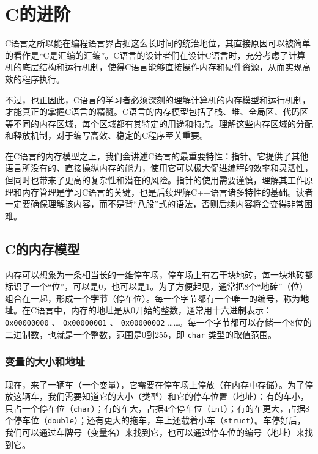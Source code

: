 \chapter{C的进阶}

C语言之所以能在编程语言界占据这么长时间的统治地位，其直接原因可以被简单的看作是“C是汇编的汇编”。C语言的设计者们在设计C语言时，充分考虑了计算机的底层结构和运行机制，使得C语言能够直接操作内存和硬件资源，从而实现高效的程序执行。

不过，也正因此，C语言的学习者必须深刻的理解计算机的内存模型和运行机制，才能真正的掌握C语言的精髓。C语言的内存模型包括了栈、堆、全局区、代码区等不同的内存区域，每个区域都有其特定的用途和特点。理解这些内存区域的分配和释放机制，对于编写高效、稳定的C程序至关重要。

在C语言的内存模型之上，我们会讲述C语言的最重要特性：指针。它提供了其他语言所没有的、直接操纵内存的能力，使用它可以极大促进编程的效率和灵活性，但同时也带来了更高的复杂性和潜在的风险。指针的使用需要谨慎，理解其工作原理和内存管理是学习C语言的关键，也是后续理解C++语言诸多特性的基础。读者一定要确保理解该内容，而不是背“八股”式的语法，否则后续内容将会变得非常困难。

\section{C的内存模型}

内存可以想象为一条相当长的一维停车场，停车场上有若干块地砖，每一块地砖都标识了一个“位”，可以是0，也可以是1。为了方便起见，通常把8个“地砖”（位）组合在一起，形成一个\textbf{字节}（停车位）。每一个字节都有一个唯一的编号，称为\textbf{地址}。在C语言中，内存的地址是从0开始的整数，通常用十六进制表示： \verb|0x00000000| 、 \verb|0x00000001| 、 \verb|0x00000002| ……。每一个字节都可以存储一个8位的二进制数，也就是一个整数，范围是0到255，即 \texttt{char} 类型的取值范围。

\subsection{变量的大小和地址}

现在，来了一辆车（一个变量），它需要在停车场上停放（在内存中存储）。为了停放这辆车，我们需要知道它的大小（类型）和它的停车位置（地址）：有的车小，只占一个停车位（\texttt{char}）；有的车大，占据4个停车位（\texttt{int}）；有的车更大，占据8个停车位（\texttt{double}）；还有更大的拖车，车上还载着小车（\texttt{struct}）。车停好后，我们可以通过车牌号（变量名）来找到它，也可以通过停车位的编号（地址）来找到它。

